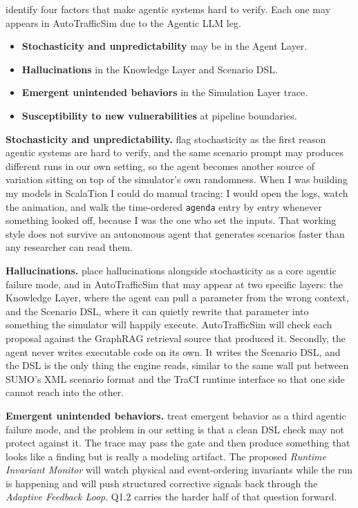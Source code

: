 \begin{bibunit}[plainnat]
\citet{koohestani2025agentguard} identify four factors that make agentic systems
hard to verify. Each one may appears in AutoTrafficSim due to the Agentic LLM leg.

\begin{itemize}
    \item \textbf{Stochasticity and unpredictability} may be in the Agent Layer.
    \item \textbf{Hallucinations} in the Knowledge Layer and Scenario DSL.
    \item \textbf{Emergent unintended behaviors} in the Simulation Layer trace.
    \item \textbf{Susceptibility to new vulnerabilities} at pipeline boundaries.
\end{itemize}

\textbf{Stochasticity and unpredictability.}
\citet{koohestani2025agentguard} flag stochasticity as the first reason
agentic systems are hard to verify, and the same scenario prompt may produces
different runs in our own setting, so the agent becomes another source of variation sitting on top of the simulator's own randomness. When I was building my models in ScalaTion I could do manual tracing: I would open the logs, watch the animation, and walk the time-ordered \texttt{agenda} entry by entry whenever something looked off, because I was the one who set the inputs. That working style does not survive an autonomous agent that generates scenarios faster than any researcher can read them.

\textbf{Hallucinations.}
\citet{koohestani2025agentguard} place hallucinations alongside
stochasticity as a core agentic failure mode, and in AutoTrafficSim that
may appear at two specific layers: the Knowledge Layer, where the agent can
pull a parameter from the wrong context, and the Scenario DSL, where it
can quietly rewrite that parameter into something the simulator will
happily execute. AutoTrafficSim will check each proposal against the
GraphRAG retrieval source that produced it. Secondly, the agent never writes executable code on its own. It writes the Scenario DSL, and the DSL is the only thing the engine reads, similar to the same wall \citet{lopez2018sumo} put between SUMO's XML scenario format and the TraCI runtime interface so that one side cannot reach into the other.

\textbf{Emergent unintended behaviors.}
\citet{koohestani2025agentguard} treat emergent behavior as a third agentic
failure mode, and the problem in our setting is that a clean DSL check
may not protect against it. The trace may pass the gate and then produce
something that looks like a finding but is really a modeling artifact.
The proposed \textit{Runtime Invariant Monitor} will watch physical and
event-ordering invariants while the run is happening and will push
structured corrective signals back through the \textit{Adaptive Feedback
Loop}. Q1.2 carries the harder half of that question forward.


\end{bibunit}
